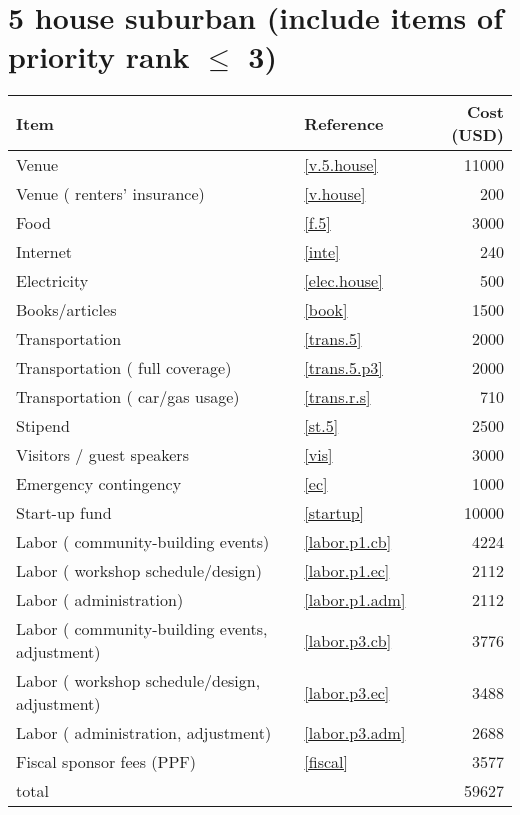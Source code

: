 \section*{5 house suburban (include items of priority rank $\leq$ 3)}
\begin{center}
\begin{tabular}{llr}
Item & Reference & Cost (USD) \\ \hline
Venue & \ref{v.5.house} & 11000 \\
Venue ( renters' insurance) & \ref{v.house} & 200 \\
Food & \ref{f.5} & 3000 \\
Internet & \ref{inte} & 240 \\
Electricity & \ref{elec.house} & 500 \\
Books/articles & \ref{book} & 1500 \\
Transportation & \ref{trans.5} & 2000 \\
Transportation ( full coverage) & \ref{trans.5.p3} & 2000 \\
Transportation ( car/gas usage) & \ref{trans.r.s} & 710 \\
Stipend & \ref{st.5} & 2500 \\
Visitors / guest speakers & \ref{vis} & 3000 \\
Emergency contingency & \ref{ec} & 1000 \\
Start-up fund & \ref{startup} & 10000 \\
Labor ( community-building events) & \ref{labor.p1.cb} & 4224 \\
Labor ( workshop schedule/design) & \ref{labor.p1.ec} & 2112 \\
Labor ( administration) & \ref{labor.p1.adm} & 2112 \\
Labor ( community-building events, adjustment) & \ref{labor.p3.cb} & 3776 \\
Labor ( workshop schedule/design, adjustment) & \ref{labor.p3.ec} & 3488 \\
Labor ( administration, adjustment) & \ref{labor.p3.adm} & 2688 \\
Fiscal sponsor fees (PPF) & \ref{fiscal} & 3577 \\ \hline
total &  & 59627
\end{tabular}
\end{center}
\newpage
